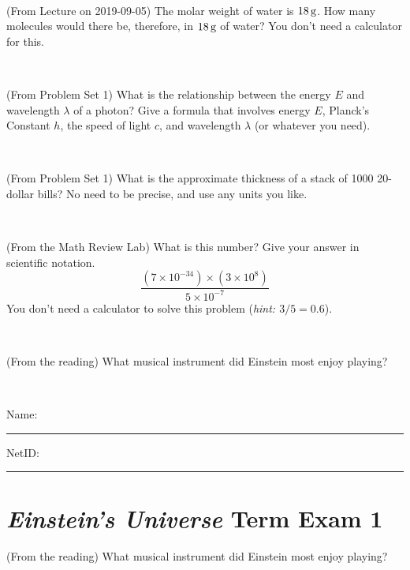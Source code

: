 \documentclass[12pt, letterpaper]{article}
\begin{document}
\vfill ~

\begin{problem} (From Lecture on 2019-09-05)
The molar weight of water is $18\,\mathrm{g}$. How many molecules would there
be, therefore, in $18\,\mathrm{g}$ of water? You don't need a calculator for
this.
\end{problem}


\vfill ~


\clearpage


\begin{problem} (From Problem Set 1)
What is the relationship between the energy $E$ and wavelength
$\lambda$ of a photon? Give a formula that involves energy $E$,
Planck's Constant $h$, the speed of light $c$, and wavelength
$\lambda$ (or whatever you need).
\end{problem}

\vfill ~

\begin{problem} (From Problem Set 1)
What is the approximate thickness of a stack of 1000 20-dollar bills?
No need to be precise, and use any units you like.
\end{problem}


\vfill ~

\begin{problem} (From the Math Review Lab)
What is this number? Give your answer in scientific notation.
$$
\frac{(7\times10^{-34})\times(3\times10^8)}{5\times10^{-7}}
$$
You don't need a calculator to solve this problem (\textit{hint: $3/5=0.6$}).
\end{problem}


\vfill ~

\begin{problem} (From the reading)
What musical instrument did Einstein most enjoy playing?
\end{problem}


\vfill ~


\cleardoublepage



\noindent
Name: \rule[-1ex]{0.60\textwidth}{0.1pt}
NetID: \rule[-1ex]{0.20\textwidth}{0.1pt}

\section*{\textsl{Einstein's Universe} Term Exam 1}
\setcounter{problem}{1}


\begin{problem} (From the reading)
What musical instrument did Einstein most enjoy playing?
\end{problem}
\end{document}

